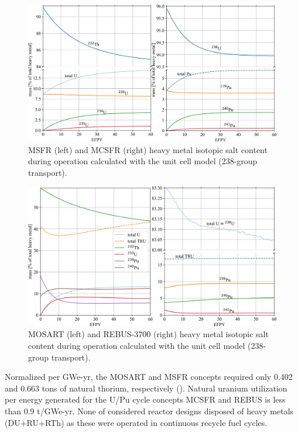 \documentclass[letterpaper]{mandc2019}
\begin{document}
\begin{figure}[!htb]
  \centering
  \includegraphics[width=\textwidth]{./Figures/msfr_mcsfr_balance.png}
  \caption{\gls{MSFR} (left) and \gls{MCSFR} (right) heavy metal isotopic salt content during operation calculated with the unit cell model (238-group transport).}
  \label{fig:msfr-u-balance}
\end{figure}
\begin{figure}[!htb]
  \centering
  \includegraphics[width=\textwidth]{./Figures/mosart_rebus_balance.png}
  \caption{\gls{MOSART} (left) and REBUS-3700 (right) heavy metal isotopic salt content during operation calculated with the unit cell model (238-group transport).}
  \label{fig:mosart-balance}
\end{figure}

Normalized per GWe-yr, the \gls{MOSART} and \gls{MSFR} concepts required only 0.402 and 0.663 tons of natural thorium, respectively (). Natural uranium utilization per energy generated for the U/Pu cycle concepts \gls{MCSFR} and REBUS is less than 0.9 t/GWe-yr. None of considered reactor designs disposed of heavy metals (\gls{DU}+\gls{RU}+\gls{RTh}) as these were operated in continuous recycle fuel cycles.
\end{document}
